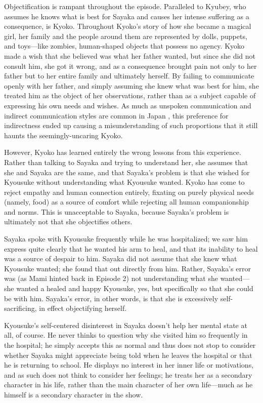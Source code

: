Objectification is rampant throughout the episode. Paralleled to Kyubey, who assumes he knows what is best for Sayaka and causes her intense suffering as a consequence, is Kyoko. Throughout Kyoko's story of how she became a magical girl, her family and the people around them are represented by dolls, puppets, and toys—like zombies, human-shaped objects that possess no agency. Kyoko made a wish that she believed was what her father wanted, but since she did not consult him, she got it wrong, and as a consequence brought pain not only to her father but to her entire family and ultimately herself. By failing to communicate openly with her father, and simply assuming she knew what was best for him, she treated him as the object of her observations, rather than as a subject capable of expressing his own needs and wishes. As much as unspoken communication and indirect communication styles are common in Japan \cite{ref53}, this preference for indirectness ended up causing a misunderstanding of such proportions that it still haunts the seemingly-uncaring Kyoko.

However, Kyoko has learned entirely the wrong lessons from this experience. Rather than talking to Sayaka and trying to understand her, she assumes that she and Sayaka are the same, and that Sayaka's problem is that she wished for Kyousuke without understanding what Kyousuke wanted. Kyoko has come to reject empathy and human connection entirely, fixating on purely physical needs (namely, food) as a source of comfort while rejecting all human companionship and norms. This is unacceptable to Sayaka, because Sayaka's problem is ultimately not that she objectifies others.

Sayaka spoke with Kyousuke frequently while he was hospitalized; we saw him express quite clearly that he wanted his arm to heal, and that its inability to heal was a source of despair to him. Sayaka did not assume that she knew what Kyousuke wanted; she found that out directly from him. Rather, Sayaka's error was (as Mami hinted back in Episode 2) not understanding what she wanted—she wanted a healed and happy Kyousuke, yes, but specifically so that she could be with him. Sayaka's error, in other words, is that she is excessively self-sacrificing, in effect objectifying herself. 

Kyousuke's self-centered disinterest in Sayaka doesn't help her mental state at all, of course. He never thinks to question why she visited him so frequently in the hospital; he simply accepts this as normal and thus does not stop to consider whether Sayaka might appreciate being told when he leaves the hospital or that he is returning to school. He displays no interest in her inner life or motivations, and as such does not think to consider her feelings; he treats her as a secondary character in his life, rather than the main character of her own life—much as he himself is a secondary character in the show.


